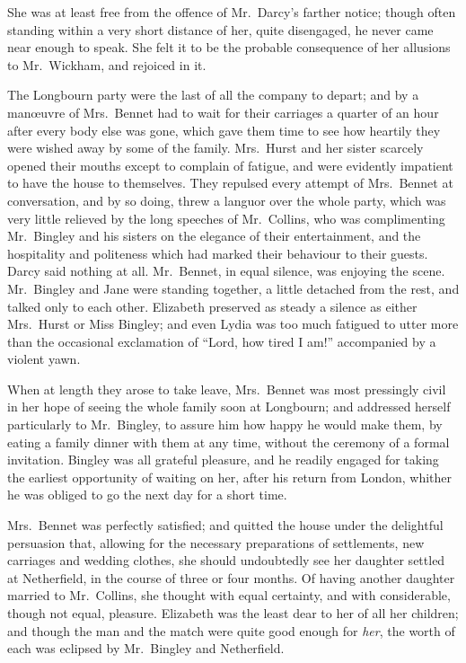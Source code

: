 She was at least free from the offence of Mr.\ Darcy’s
farther notice; though often standing within a very short
distance of her, quite disengaged, he never came near
enough to speak. She felt it to be the probable consequence
of her allusions to Mr.\ Wickham, and rejoiced in it.

The Longbourn party were the last of all the company
to depart; and by a manœuvre of Mrs.\ Bennet had to
wait for their carriages a quarter of an hour after every
body else was gone, which gave them time to see how
heartily they were wished away by some of the family.
Mrs.\ Hurst and her sister scarcely opened their mouths
except to complain of fatigue, and were evidently impatient
to have the house to themselves. They repulsed every
attempt of Mrs.\ Bennet at conversation, and by so doing,
threw a languor over the whole party, which was very
little relieved by the long speeches of Mr.\ Collins, who was
complimenting Mr.\ Bingley and his sisters on the elegance
of their entertainment, and the hospitality and politeness
which had marked their behaviour to their guests. Darcy
said nothing at all. Mr.\ Bennet, in equal silence, was
enjoying the scene. Mr.\ Bingley and Jane were standing
together, a little detached from the rest, and talked only
to each other. Elizabeth preserved as steady a silence as
either Mrs.\ Hurst or Miss Bingley; and even Lydia was
too much fatigued to utter more than the occasional
exclamation of “Lord, how tired I am!” accompanied
by a violent yawn.

When at length they arose to take leave, Mrs.\ Bennet
was most pressingly civil in her hope of seeing the whole
family soon at Longbourn; and addressed herself particularly
to Mr.\ Bingley, to assure him how happy he would
make them, by eating a family dinner with them at any
time, without the ceremony of a formal invitation. Bingley
was all grateful pleasure, and he readily engaged for taking
the earliest opportunity of waiting on her, after his return
from London, whither he was obliged to go the next day
for a short time.

Mrs.\ Bennet was perfectly satisfied; and quitted the
house under the delightful persuasion that, allowing for
the necessary preparations of settlements, new carriages
and wedding clothes, she should undoubtedly see her
daughter settled at Netherfield, in the course of three or
four months. Of having another daughter married to
Mr.\ Collins, she thought with equal certainty, and with
considerable, though not equal, pleasure. Elizabeth was
the least dear to her of all her children; and though the
man and the match were quite good enough for \textit{her},
the worth of each was eclipsed by Mr.\ Bingley and
Netherfield.

